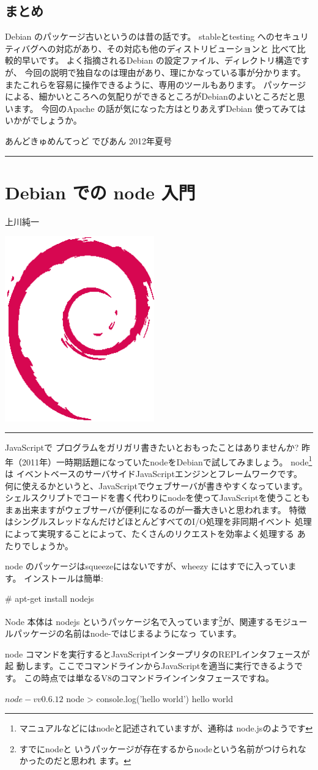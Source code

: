 \documentclass[mingoth,a4paper]{jsarticle}
\renewcommand{\dancersection}[2]{%
\newpage
あんどきゅめんてっど でびあん 2012年夏号
%
\vspace{0.1mm}\\
{\color{dancerdarkblue}\rule{\hsize}{2mm}}

%
%
\begin{minipage}[t]{0.6\hsize}
\color{dancerdarkblue}
\vspace{1cm}
\section{#1}
\hfill{}#2\\
\end{minipage}
\begin{minipage}[t]{0.4\hsize}
\vspace{-2cm}
\hfill{}\includegraphics[height=8cm]{image200502/openlogo-nd.eps}\\
\vspace{-5cm}
\end{minipage}
%
{\color{dancerlightblue}\rule{0.66\hsize}{2mm}}
%
\vspace{2cm}
}
\begin{document}
\subsection{まとめ}
Debian のパッケージ古いというのは昔の話です。
stableとtesting へのセキュリティバグへの対応があり、その対応も他のディストリビューションと
比べて比較的早いです。
よく指摘されるDebian の設定ファイル、ディレクトリ構造ですが、
今回の説明で独自なのは理由があり、理にかなっている事が分かります。
またこれらを容易に操作できるように、専用のツールもあります。
パッケージによる、細かいところへの気配りができるところがDebianのよいところだと思います。
今回のApache の話が気になった方はとりあえずDebian 使ってみてはいかがでしょうか。

\dancersection{Debian での node 入門}{上川純一}

JavaScript\cite{javascript-mdn,ecmascript}で
プログラムをガリガリ書きたいとおもったことはありませんか?
昨年（2011年）一時期話題になっていたnodeをDebianで試してみましょう。
node\footnote{マニュアルなどにはnodeと記述されていますが、通称は
node.jsのようです}は
イベントベースのサーバサイドJavaScriptエンジンとフレームワークです。
何に使えるかというと、JavaScriptでウェブサーバが書きやすくなっています。
シェルスクリプトでコードを書く代わりにnodeを使ってJavaScriptを使うことも
まぁ出来ますがウェブサーバが便利になるのが一番大きいと思われます。
特徴はシングルスレッドなんだけどほとんどすべてのI/O処理を非同期イベント
処理によって実現することによって、たくさんのリクエストを効率よく処理する
あたりでしょうか。

node のパッケージはsqueezeにはないですが、wheezy にはすでに入っていま
す。
インストールは簡単:
\begin{commandline}
# apt-get install nodejs
\end{commandline}

Node 本体は nodejs というパッケージ名で入っています\footnote{すでにnodeと
いうパッケージが存在するからnodeという名前がつけられなかったのだと思われ
ます。}が、関連するモジュールパッケージの名前はnode-ではじまるようになっ
ています。

node コマンドを実行するとJavaScriptインタープリタのREPLインタフェースが起
動します。ここでコマンドラインからJavaScriptを適当に実行できるようです。
この時点では単なるV8のコマンドラインインタフェースですね。

\begin{commandline}
$ node -v
v0.6.12
$ node
> console.log('hello world')
hello world
\end{commandline}
\end{document}
